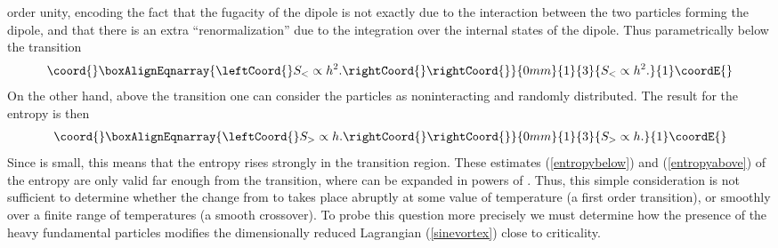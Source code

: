 \documentclass[a4paper,aps,prd,superscriptaddress,showpacs,showkeys]{revtex4}
\begin{document}
order unity, encoding the fact that the fugacity of the dipole is not
exactly \coordHE{} due to the interaction between the two particles forming
the dipole, and that there is an extra ``renormalization'' due to  the
integration over the internal states of the dipole. Thus parametrically
below the transition
\begin{eqnarray}\coord{}\boxAlignEqnarray{\leftCoord{}
S_<\propto h^2 .\rightCoord{}
\label{entropybelow}
\rightCoord{}}{0mm}{1}{3}{
S_<\propto h^2 .
}{1}\coordE{}\end{eqnarray}
On the other hand, above the transition one can consider the
\myHighlight{$\Phi$}\coordHE{} particles as noninteracting and randomly distributed.  The result
for the entropy is then
\begin{eqnarray}\coord{}\boxAlignEqnarray{\leftCoord{}
S_>\propto h .\rightCoord{}
\label{entropyabove}
\rightCoord{}}{0mm}{1}{3}{
S_>\propto h .
}{1}\coordE{}\end{eqnarray}
Since \coordHE{} is small, this means that the entropy rises strongly in
the transition region.   These estimates (\ref{entropybelow}) and
(\ref{entropyabove}) of the entropy are only valid far enough from the
transition, where \coordHE{} can be expanded in powers of \coordHE{}. Thus, this simple
consideration is not sufficient to determine whether the change from
\coordHE{}
to \coordHE{} takes place abruptly at some value of temperature
(a first order transition),  or smoothly over a finite range of
temperatures \coordHE{} (a smooth crossover).
To probe this question more precisely we must determine how the presence
of
the heavy fundamental \myHighlight{$\Phi$}\coordHE{} particles modifies the dimensionally reduced
Lagrangian (\ref{sinevortex}) close to criticality.
\end{document}
